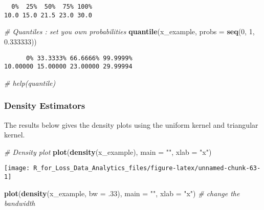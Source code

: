 \documentclass[]{book}
\newenvironment{Shaded}{\begin{snugshade}}{\end{snugshade}}
\newcommand{\KeywordTok}[1]{\textcolor[rgb]{0.13,0.29,0.53}{\textbf{#1}}}
\newcommand{\DataTypeTok}[1]{\textcolor[rgb]{0.13,0.29,0.53}{#1}}
\newcommand{\DecValTok}[1]{\textcolor[rgb]{0.00,0.00,0.81}{#1}}
\newcommand{\FloatTok}[1]{\textcolor[rgb]{0.00,0.00,0.81}{#1}}
\newcommand{\StringTok}[1]{\textcolor[rgb]{0.31,0.60,0.02}{#1}}
\newcommand{\CommentTok}[1]{\textcolor[rgb]{0.56,0.35,0.01}{\textit{#1}}}
\newcommand{\NormalTok}[1]{#1}
\theoremstyle{definition}
\theoremstyle{definition}
\theoremstyle{definition}
\theoremstyle{remark}
\begin{document}
\begin{verbatim}
  0%  25%  50%  75% 100% 
10.0 15.0 21.5 23.0 30.0 
\end{verbatim}

\begin{Shaded}
\begin{Highlighting}[]
\CommentTok{# Quantiles : set you own probabilities}
\KeywordTok{quantile}\NormalTok{(x_example, }\DataTypeTok{probs =} \KeywordTok{seq}\NormalTok{(}\DecValTok{0}\NormalTok{, }\DecValTok{1}\NormalTok{, }\FloatTok{0.333333}\NormalTok{))}
\end{Highlighting}
\end{Shaded}

\begin{verbatim}
      0% 33.3333% 66.6666% 99.9999% 
10.00000 15.00000 23.00000 29.99994 
\end{verbatim}

\begin{Shaded}
\begin{Highlighting}[]
\CommentTok{# help(quantile)}
\end{Highlighting}
\end{Shaded}

\subsubsection{Density Estimators}\label{density-estimators}

The results below gives the density plots using the uniform kernel and
triangular kernel.

\begin{Shaded}
\begin{Highlighting}[]
\CommentTok{# Density plot }
\KeywordTok{plot}\NormalTok{(}\KeywordTok{density}\NormalTok{(x_example), }\DataTypeTok{main =} \StringTok{""}\NormalTok{, }\DataTypeTok{xlab =} \StringTok{"x"}\NormalTok{)}
\end{Highlighting}
\end{Shaded}

\begin{center}\texttt{[image: R\_for\_Loss\_Data\_Analytics\_files/figure-latex/unnamed-chunk-63-1]} \end{center}

\begin{Shaded}
\begin{Highlighting}[]
\KeywordTok{plot}\NormalTok{(}\KeywordTok{density}\NormalTok{(x_example, }\DataTypeTok{bw =}\NormalTok{ .}\DecValTok{33}\NormalTok{), }\DataTypeTok{main =} \StringTok{""}\NormalTok{, }\DataTypeTok{xlab =} \StringTok{"x"}\NormalTok{)  }\CommentTok{# change the bandwidth}
\end{Highlighting}
\end{Shaded}
\end{document}
